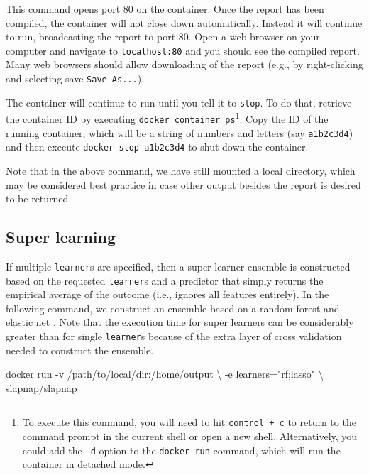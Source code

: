 \documentclass[]{article}
\newenvironment{Shaded}{\begin{snugshade}}{\end{snugshade}}
\newcommand{\StringTok}[1]{\textcolor[rgb]{0.31,0.60,0.02}{#1}}
\newcommand{\ExtensionTok}[1]{#1}
\newcommand{\NormalTok}[1]{#1}
\begin{document}
This command opens port 80 on the container. Once the report has been
compiled, the container will not close down automatically. Instead it
will continue to run, broadcasting the report to port 80. Open a web
browser on your computer and navigate to \texttt{localhost:80} and you
should see the compiled report. Many web browsers should allow
downloading of the report (e.g., by right-clicking and selecting save
\texttt{Save\ As...}).

The container will continue to run until you tell it to \texttt{stop}.
To do that, retrieve the container ID by executing
\texttt{docker\ container\ ps}\footnote{To execute this command, you
  will need to hit \texttt{control\ +\ c} to return to the command
  prompt in the current shell or open a new shell. Alternatively, you
  could add the \texttt{-d} option to the \texttt{docker\ run} command,
  which will run the container in
  \href{https://docs.docker.com/engine/reference/run/\#detached-vs-foreground}{detached
  mode}.}. Copy the ID of the running container, which will be a string
of numbers and letters (say \texttt{a1b2c3d4}) and then execute
\texttt{docker\ stop\ a1b2c3d4} to shut down the container.

Note that in the above command, we have still mounted a local directory,
which may be considered best practice in case other output besides the
report is desired to be returned.

\subsection{Super learning}\label{super-learning}

If multiple \texttt{learner}s are specified, then a super learner
ensemble \citep{vanderlaan2007} is constructed based on the requested
\texttt{learner}s and a predictor that simply returns the empirical
average of the outcome (i.e., ignores all features entirely). In the
following command, we construct an ensemble based on a random forest
\citep{breiman2001} and elastic net \citep{zou2005}. Note that the
execution time for super learners can be considerably greater than for
single \texttt{learner}s because of the extra layer of cross validation
needed to construct the ensemble.

\begin{Shaded}
\begin{Highlighting}[]
\ExtensionTok{docker}\NormalTok{ run -v /path/to/local/dir:/home/output \textbackslash{}}
\NormalTok{           -e learners=}\StringTok{"rf;lasso"}\NormalTok{ \textbackslash{}}
\NormalTok{           slapnap/slapnap}
\end{Highlighting}
\end{Shaded}
\end{document}
